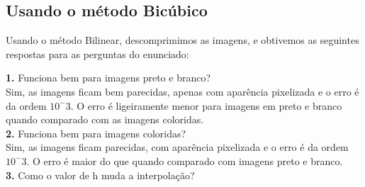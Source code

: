 \documentclass[12pt,letterpaper]{article}
\begin{document}
	\begin{figure}[h]
	\end{figure}
	
	\begin{figure}[h]
	\end{figure}
	
	\begin{figure}[h]
	\end{figure}
	
		\begin{figure}[h]
		\end{figure}
	
	\clearpage
		
	\subsection{Usando o método Bicúbico}

	Usando o método Bilinear, descomprimimos as imagens, e obtivemos as seguintes respostas para as perguntas do enunciado:
	
	\textbf{1.} Funciona bem para imagens preto e branco?\\
	Sim, as imagens ficam bem parecidas, apenas com aparência pixelizada e o erro é da ordem $10^-3$. O erro é ligeiramente menor para imagens em preto e branco quando comparado com as imagens coloridas.\\
	
	\textbf{2.} Funciona bem para imagens coloridas?\\
	
	Sim, as imagens ficam parecidas, com aparência pixelizada e o erro é da ordem $10^-3$. O erro é maior do que quando comparado com imagens preto e branco.\\
	\textbf{3.} Como o valor de h muda a interpolação?\\
	
\end{document}
